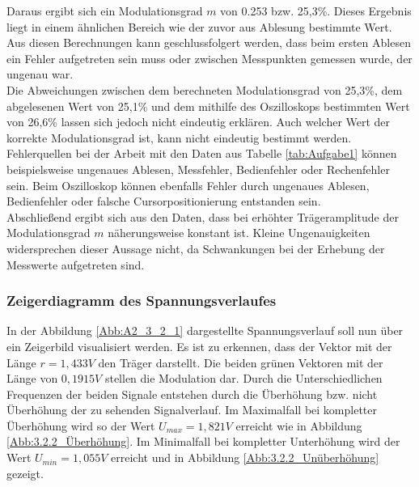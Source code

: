 \documentclass[12pt]{scrartcl}
\begin{document}
Daraus ergibt sich ein Modulationsgrad $m$ von 0.253 bzw. 25,3\%. 
Dieses Ergebnis liegt in einem ähnlichen Bereich wie der zuvor aus Ablesung bestimmte Wert.\\
Aus diesen Berechnungen kann geschlussfolgert werden, dass beim ersten Ablesen ein Fehler aufgetreten sein muss oder zwischen Messpunkten gemessen wurde, der ungenau war.\\
Die Abweichungen zwischen dem berechneten Modulationsgrad von 25,3\%, dem abgelesenen Wert von 25,1\% und dem mithilfe des Oszilloskops bestimmten Wert von 26,6\% lassen sich jedoch nicht eindeutig erklären. 
Auch welcher Wert der korrekte Modulationsgrad ist, kann nicht eindeutig bestimmt werden.\\
Fehlerquellen bei der Arbeit mit den Daten aus Tabelle \ref{tab:Aufgabe1} können beispielsweise ungenaues Ablesen, Messfehler, Bedienfehler oder Rechenfehler sein. 
Beim Oszilloskop können ebenfalls Fehler durch ungenaues Ablesen, Bedienfehler oder falsche Cursorpositionierung entstanden sein.\\
Abschließend ergibt sich aus den Daten, dass bei erhöhter Trägeramplitude der Modulationsgrad $m$ näherungsweise konstant ist. 
Kleine Ungenauigkeiten widersprechen dieser Aussage nicht, da Schwankungen bei der Erhebung der Messwerte aufgetreten sind.
\newpage
\subsubsection{Zeigerdiagramm des Spannungsverlaufes}
\label{kap:2.2}
In der Abbildung \ref{Abb:A2_3_2_1} dargestellte Spannungsverlauf soll nun über ein Zeigerbild visualisiert werden. Es ist zu erkennen, dass  der Vektor mit der Länge $r = 1,433 V$ den Träger darstellt. Die beiden grünen Vektoren mit der Länge von $0,1915 V$ stellen die Modulation dar.
Durch die Unterschiedlichen Frequenzen der beiden Signale entstehen durch die Überhöhung bzw. nicht Überhöhung der zu sehenden Signalverlauf. Im Maximalfall bei kompletter Überhöhung wird so der Wert $U_{max} = 1,821 V$ erreicht wie in Abbildung \ref{Abb:3.2.2_Überhöhung}. Im Minimalfall bei kompletter Unterhöhung wird der Wert $U_{min} = 1,055 V$ erreicht und in Abbildung \ref{Abb:3.2.2_Unüberhöhung} gezeigt.
\end{document}
